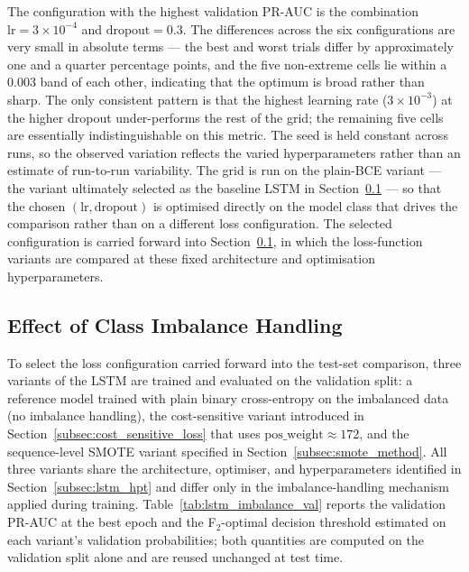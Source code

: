 \documentclass[oneside,12pt,parskip=half,american,numbers=noenddot]{scrreprt}
\begin{document}
The configuration with the highest validation PR-AUC is the combination $\text{lr} = 3\times 10^{-4}$ and $\text{dropout} = 0.3$. The differences across the six configurations are very small in absolute terms — the best and worst trials differ by approximately one and a quarter percentage points, and the five non-extreme cells lie within a $0.003$ band of each other, indicating that the optimum is broad rather than sharp. The only consistent pattern is that the highest learning rate ($3\times 10^{-3}$) at the higher dropout under-performs the rest of the grid; the remaining five cells are essentially indistinguishable on this metric. The seed is held constant across runs, so the observed variation reflects the varied hyperparameters rather than an estimate of run-to-run variability. The grid is run on the plain-BCE variant — the variant ultimately selected as the baseline LSTM in Section~\ref{subsec:smote} — so that the chosen $(\text{lr}, \text{dropout})$ is optimised directly on the model class that drives the comparison rather than on a different loss configuration. The selected configuration is carried forward into Section~\ref{subsec:smote}, in which the loss-function variants are compared at these fixed architecture and optimisation hyperparameters.



\subsection{Effect of Class Imbalance Handling}
\label{subsec:smote}

To select the loss configuration carried forward into the test-set comparison, three variants of the LSTM are trained and evaluated on the validation split: a reference model trained with plain binary cross-entropy on the imbalanced data (no imbalance handling), the cost-sensitive variant introduced in Section~\ref{subsec:cost_sensitive_loss} that uses $\text{pos\_weight} \approx 172$, and the sequence-level SMOTE variant specified in Section~\ref{subsec:smote_method}. All three variants share the architecture, optimiser, and hyperparameters identified in Section~\ref{subsec:lstm_hpt} and differ only in the imbalance-handling mechanism applied during training. Table~\ref{tab:lstm_imbalance_val} reports the validation PR-AUC at the best epoch and the F$_2$-optimal decision threshold estimated on each variant's validation probabilities; both quantities are computed on the validation split alone and are reused unchanged at test time.
\end{document}
